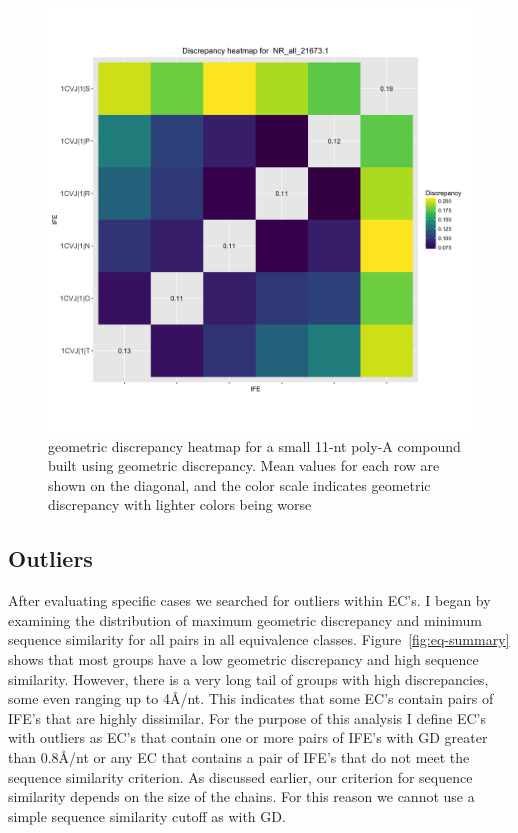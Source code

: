 \begin{figure}[h]
  \includegraphics[width=\textwidth]{chapter-3/figs/small-aa-disc}
  \caption{geometric discrepancy heatmap for a small 11-nt poly-A compound built using
    geometric discrepancy. Mean values for each row are shown on the diagonal, and the
  color scale indicates geometric discrepancy with lighter colors being worse}
\label{fig:small-aa-disc}
\end{figure}

\subsection{Outliers}

After evaluating specific cases we searched for outliers within EC's. I began by
examining the distribution of maximum geometric discrepancy and minimum sequence
similarity for all pairs in all equivalence classes. Figure~\ref{fig:eq-summary}
shows that most groups have a low geometric discrepancy and high sequence
similarity. However, there is a very long tail of groups with high
discrepancies, some even ranging up to 4{\AA}/nt. This indicates that some EC's
contain pairs of IFE's that are highly dissimilar. For the purpose of this
analysis I define EC's with outliers as EC's that contain one or more pairs of
IFE's with GD greater than 0.8{\AA}/nt or any EC that contains a pair of IFE's
that do not meet the sequence similarity criterion. As discussed earlier, our
criterion for sequence similarity depends on the size of the chains. For this
reason we cannot use a simple sequence similarity cutoff as with GD.

